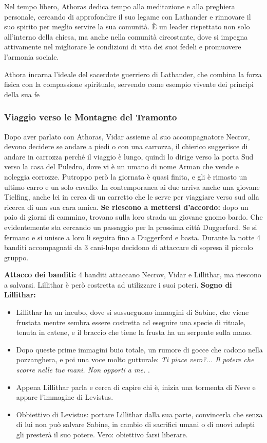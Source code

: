 \documentclass{article}
\begin{document}
                  Nel tempo libero, Athoras dedica tempo alla meditazione e alla preghiera personale, cercando di approfondire il suo legame con Lathander e rinnovare il suo spirito per meglio servire la sua comunità. È un leader rispettato non solo all'interno della chiesa, ma anche nella comunità circostante, dove si impegna attivamente nel migliorare le condizioni di vita dei suoi fedeli e promuovere l'armonia sociale.
                  
                  Athora incarna l'ideale del sacerdote guerriero di Lathander, che combina la forza fisica con la compassione spirituale, servendo come esempio vivente dei principi della sua fe
    \subsubsection{Viaggio verso le Montagne del Tramonto}
       
        Dopo aver parlato con Athoras, Vidar assieme al suo accompagnatore Necrov, devono decidere se andare a piedi o con una carrozza, il chierico suggerisce di andare in carrozza perché il viaggio è lungo, quindi lo dirige verso la porta Sud verso la casa del Puledro, dove vi è un umano di nome Arman che vende e noleggia corrozze. Putroppo però la giornata è quasi finita, e gli è rimasto un ultimo carro e un solo cavallo. In contemporanea ai due arriva anche una giovane Tielfing, anche lei in cerca di un carretto che le serve per viaggiare verso sud alla ricerca di una sua cara amica.
        \textbf{Se riescono a mettersi d'accordo: } dopo un paio di giorni di cammino, trovano sulla loro strada un giovane gnomo bardo. Che evidentemente sta cercando un passaggio per la prossima città Duggerford. Se si fermano e si unisce a loro li seguira fino a Duggerford e basta. 
            Durante la notte 4 banditi accompagnati da 3 cani-lupo decidono di attaccare di sopresa il piccolo gruppo. 
            
        \textbf{Attacco dei banditi: } 4 banditi attaccano Necrov, Vidar e Lillithar, ma riescono a salvarsi. Lillithar è però costretta ad utilizzare i suoi poteri.
        \textbf{Sogno di Lillithar:} \begin{itemize}
            \item Lillithar ha un incubo, dove si sussueguono immagini di Sabine, che viene frustata mentre sembra essere costretta ad eseguire una specie di rituale, tenuta in catene, e il braccio che tiene la frusta ha un serpente sulla mano. 
            \item Dopo queste prime immagini buio totale, un rumore di gocce che cadono nella pozzanghera, e poi una voce molto gutturale: \textit{Ti piace vero?... Il potere che scorre nelle tue mani. Non opporti a me.} . 
            \item Appena Lillithar parla e cerca di capire chi è, inizia una tormenta di Neve e appare l'immagine di Levistus.
            \item Obbiettivo di Levistus: portare Lillithar dalla sua parte, convincerla che senza di lui non può salvare Sabine, in cambio di sacrifici umani o di nuovi adepti gli presterà il suo potere. Vero: obiettivo farsi liberare. 
        
        \end{itemize}
\end{document}
